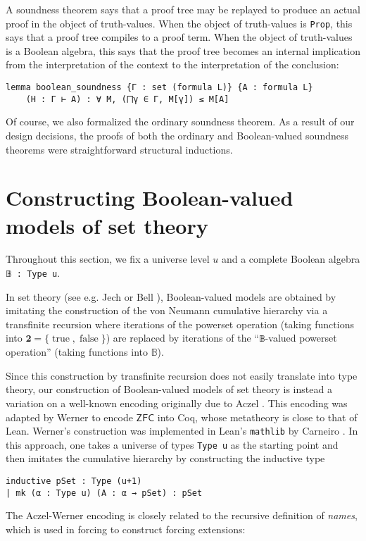 \documentclass[a4paper,USenglish,cleveref, autoref]{lipics-v2019}
\newcommand{\B}{\mathbb{B}}
\newcommand{\lil}{\lstinline}
\theoremstyle{theorem}
\theoremstyle{definition}
\begin{document}
A soundness theorem says that a proof tree may be replayed to produce an actual proof in the object of truth-values. When the object of truth-values is \lil{Prop}, this says that a proof tree compiles to a proof term. When the object of truth-values is a Boolean algebra, this says that the proof tree becomes an internal implication from the interpretation of the context to the interpretation of the conclusion:

\begin{lstlisting}[gobble=2]
  lemma boolean_soundness {Γ : set (formula L)} {A : formula L}
    (H : Γ ⊢ A) : ∀ M, (⨅γ ∈ Γ, M[γ]) ≤ M[A]
\end{lstlisting}

Of course, we also formalized the ordinary soundness theorem. As a result of our design decisions, the proofs of both the ordinary and Boolean-valued soundness theorems were straightforward structural inductions.


\section{Constructing Boolean-valued models of set theory}
\label{sect:bvm}
Throughout this section, we fix a universe level $u$ and a complete Boolean algebra \lstinline{𝔹 : Type u}.

In set theory (see e.g. Jech \cite{jech2013set} or Bell \cite{bell2011set}), Boolean-valued models are obtained by imitating the construction of the von Neumann cumulative hierarchy via a transfinite recursion where iterations of the powerset operation (taking functions into $\mathbf{2} = \{\operatorname{true}, \operatorname{false}\}$) are replaced by iterations of the ``\lstinline{𝔹}-valued powerset operation'' (taking functions into $\B$).

Since this construction by transfinite recursion does not easily translate into type theory, our construction of Boolean-valued models of set theory is instead a variation on a well-known encoding originally due to Aczel \cite{aczel1978type, aczel1986type, aczel1982type}. This encoding was adapted by Werner \cite{werner1997sets} to encode $\mathsf{ZFC}$ into Coq, whose metatheory is close to that of Lean. Werner's construction was implemented in Lean's \texttt{mathlib} by Carneiro \cite{mario1}. In this approach, one takes a universe of types \texttt{Type u} as the starting point and then imitates the cumulative hierarchy by constructing the inductive type
\begin{lstlisting}
inductive pSet : Type (u+1)
| mk (α : Type u) (A : α → pSet) : pSet
\end{lstlisting}
The Aczel-Werner encoding is closely related to the recursive definition of \emph{names}, which is used in forcing to construct forcing extensions:
\end{document}
